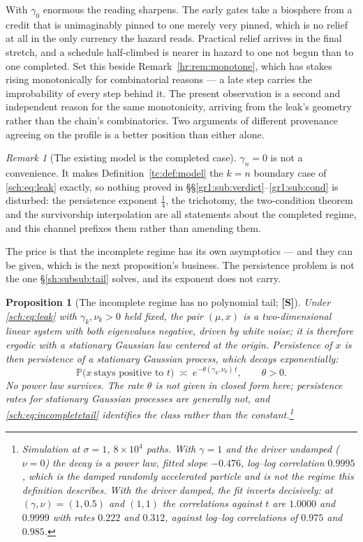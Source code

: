 \documentclass[11pt]{article}
\numberwithin{equation}{section}
\theoremstyle{plain}
\newtheorem{proposition}[theorem]{Proposition}
\theoremstyle{definition}
\theoremstyle{remark}
\newtheorem{remark}[theorem]{Remark}
\newcommand{\PP}{\mathbb{P}}
\begin{document}
With $\gamma_0$ enormous the reading sharpens. The early gates take a
biosphere from a credit that is unimaginably pinned to one merely very
pinned, which is no relief at all in the only currency the hazard reads.
Practical relief arrives in the final stretch, and a schedule
half-climbed is nearer in hazard to one not begun than to one completed. Set this beside Remark~\ref{hr:rem:monotone}, which has stakes rising
monotonically for combinatorial reasons --- a late step carries the
improbability of every step behind it. The present observation is a
second and independent reason for the same monotonicity, arriving from
the leak's geometry rather than the chain's combinatorics. Two arguments
of different provenance agreeing on the profile is a better position
than either alone.

\begin{remark}[The existing model is the completed case]
\label{sch:rem:limit}
$\gamma_n=0$ is not a convenience. It makes
Definition~\ref{tc:def:model} the $k=n$ boundary case of
\eqref{sch:eq:leak} exactly, so nothing proved in
\S\S\ref{gr1:sub:verdict}--\ref{gr1:sub:cond} is disturbed: the
persistence exponent $\tfrac14$, the trichotomy, the two-condition
theorem and the survivorship interpolation are all statements about the
completed regime, and this channel prefixes them rather than amending
them.

The price is that the incomplete regime has its own asymptotics --- and
they can be given, which is the next proposition's business. The
persistence problem is not the one \S\ref{sh:subsub:tail} solves, and
its exponent does not carry.
\end{remark}

\begin{proposition}[The incomplete regime has no polynomial tail;
\textbf{[S]}]\label{sch:prop:exponent}
Under \eqref{sch:eq:leak} with $\gamma_k,\nu_k>0$ held fixed, the pair
$(\mu,x)$ is a two-dimensional linear system with both eigenvalues
negative, driven by white noise; it is therefore ergodic with a
stationary Gaussian law centered at the origin. Persistence of $x$ is then
persistence of a stationary Gaussian process, which decays
\emph{exponentially}:
\begin{equation}\label{sch:eq:incompletetail}
\PP\bigl(x\ \text{stays positive to }t\bigr)\;\asymp\;e^{-\theta(\gamma_k,\nu_k)\,t},
\qquad \theta>0 .
\end{equation}
No power law survives. The rate $\theta$ is not given in closed form
here; persistence rates for stationary Gaussian processes are generally
not, and \eqref{sch:eq:incompletetail} identifies the class rather than
the constant.\footnote{Simulation at $\sigma=1$, $8\times10^{4}$ paths.
With $\gamma=1$ and the driver \emph{undamped} ($\nu=0$) the decay is a
power law, fitted slope $-0.476$, log--log correlation $0.9995$, which is the damped randomly accelerated particle and is not the regime
this definition describes. With the driver damped, the fit inverts
decisively: at $(\gamma,\nu)=(1,0.5)$ and $(1,1)$ the correlations
against $t$ are $1.0000$ and $0.9999$ with rates $0.222$ and $0.312$,
against log--log correlations of $0.975$ and $0.985$.}
\end{proposition}
\end{document}
